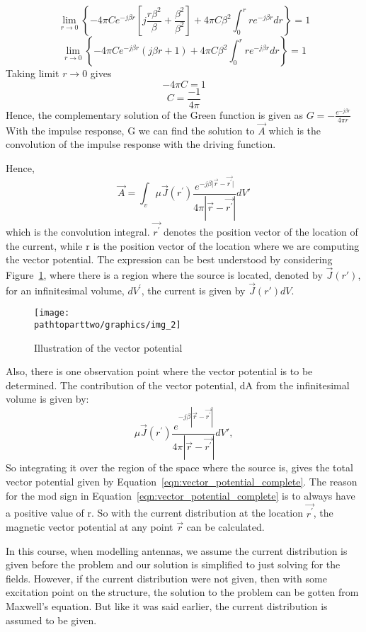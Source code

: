 \begin{dmath*}
\lim\limits_{r\rightarrow0} \left\lbrace-4\pi C e^{-j\beta r}\left[j\frac{r\beta^{2}}{\beta} +\frac{\beta^{2}}{\beta^{2}}\right] + 4\pi C\beta^{2}\int_{0}^{r}re^{-j\beta r}dr\right\rbrace = 1
\end{dmath*}
\begin{dmath*}
\lim\limits_{r\rightarrow0} \left\lbrace-4\pi C e^{-j\beta r}(j\beta r+1) + 4\pi C\beta^{2}\int_{0}^{r}re^{-j\beta r}dr\right\rbrace = 1
\end{dmath*}
Taking limit $r\rightarrow0$ gives
$$-4\pi C= 1$$
$$C = \frac{-1}{4\pi}$$
Hence, the complementary solution of the Green function is given as $ G= -\frac{e^{-j\beta r}}{4\pi r}$
With the impulse response, G we can find the solution to $\vec{A}$ which is the convolution of the impulse response with the driving function.

Hence, 
\begin{equation}
\vec{A}=\int_{v}\mu\vec{J}(r^{'}) \frac{e^{-j\beta\vert\vec{r}-\vec{r^{'}}\vert}}{4\pi|\vec{r}-\vec{r^{'}}|}dV'
\label{eqn:vector_potential_complete}
\end{equation}
which is the convolution integral. $\vec{r^{'}}$ denotes the position vector of the location of the current, while r is the position vector of the location where we are computing the vector potential. The expression can be best understood by considering Figure~\ref{fig:img_2}, where there is a region where the source is located, denoted by $\vec{J}(r')$, for an infinitesimal volume, $dV^{'}$, the current is given by $\vec{J}(r')dV$.
\begin{figure}[h]
\centering
\texttt{[image: \\pathtoparttwo/graphics/img\_2]}
\caption{Illustration of the vector potential}
\label{fig:img_2}
\end{figure}

Also, there is one observation point where the vector potential is to be determined. The contribution of the vector potential, dA from the infinitesimal volume is given by: 
\begin{equation}
\mu\vec{J}(r^{'}) \frac{e^{-j\beta|\vec{r}-\vec{r^{'}}|}}{4\pi|\vec{r}-\vec{r^{'}}|}dV',
\end{equation}
So integrating it over the region of the space where the source is, gives the total vector potential given by Equation~\eqref{eqn:vector_potential_complete}. The reason for the mod sign in Equation~\eqref{eqn:vector_potential_complete} is to always have a positive value of r. So with the current distribution at the location $\vec{r^{'}}$, the magnetic vector potential at any point $\vec{r}$ can be calculated.

In this course, when modelling antennas, we assume the current distribution is given before the problem and our solution is simplified to just solving for the fields. However, if the current distribution were not given, then with some excitation point on the structure, the solution to the problem can be gotten from Maxwell's equation. But like it was said earlier, the current distribution is assumed to be given.
